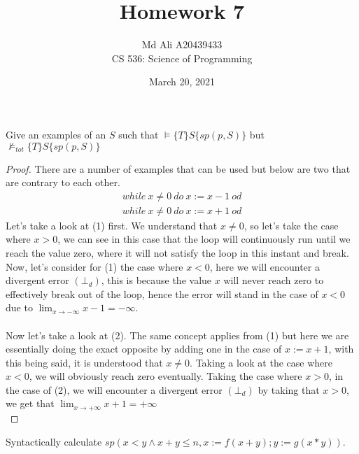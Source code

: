 \documentclass[12pt]{article}
\newenvironment{exercise}[2][Exercise]{\begin{trivlist}
\item[\hskip \labelsep {\bfseries #1}\hskip \labelsep {\bfseries #2.}]}{\end{trivlist}}
\begin{document}
 
\title{Homework 7}
\author{Md Ali A20439433 \\ 
CS 536: Science of Programming} 
\date{March 20, 2021}

\maketitle
 
\begin{exercise}{1}
Give an examples of an $S$ such that $\models \{T\} S \{sp(p,S)\}$ but $\not\models_{tot} \{T\}S\{sp(p,S)\}$
\end{exercise} 

\begin{proof}
There are a number of examples that can be used but below are two that are contrary to each other. 
\begin{gather}
    while\: x \neq 0\: do\: x := x - 1\: od \\ 
    while\: x \neq 0\: do\: x := x + 1\: od
\end{gather}
Let's take a look at (1) first. We understand that $x \neq 0$, so let's take the case where $x > 0$, we can see in this case that the loop will continuously run until we reach the value zero, where it will not satisfy the loop in this instant and break. Now, let's consider for (1) the case where $x < 0$, here we will encounter a divergent error $(\bot_{d})$, this is because the value $x$ will never reach zero to effectively break out of the loop, hence the error will stand in the case of $x < 0$ due to $\lim_{x \to -\infty}x - 1= -\infty$. \\ \\ 
Now let's take a look at (2). The same concept applies from (1) but here we are essentially doing the exact opposite by adding one in the case of $x := x + 1$, with this being said, it is understood that $x \neq 0$. Taking a look at the case where $x < 0$, we will obviously reach zero eventually. Taking the case where $x > 0$, in the case of (2), we will encounter a divergent error $(\bot_{d})$ by taking that $x > 0$, we get that $\lim_{x \to +\infty}x + 1= +\infty$ \\
\end{proof}

\begin{exercise}{2}
Syntactically calculate $sp(x < y \land x + y \leq n, x := f(x+y); y := g(x*y))$. 
\end{exercise}
 
\end{document}
